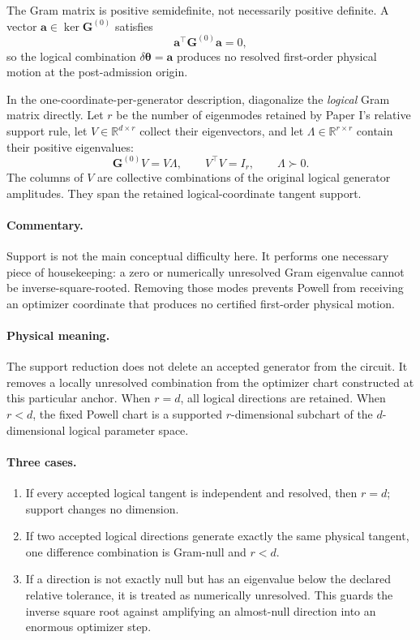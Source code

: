 \documentclass[11pt]{article}
\newcommand{\R}{\mathbb R}
\newcommand{\commentary}{\paragraph{Commentary.}}
\newcommand{\physical}{\paragraph{Physical meaning.}}
\begin{document}
The Gram matrix is positive semidefinite, not necessarily positive definite.
A vector
\(\mathbf a\in\ker\mathbf G^{(0)}\) satisfies
\begin{equation}
\mathbf a^\top\mathbf G^{(0)}\mathbf a=0,
\end{equation}
so the logical combination \(\delta\boldsymbol\theta=\mathbf a\) produces no
resolved first-order physical motion at the post-admission origin.

In the one-coordinate-per-generator description, diagonalize the
\emph{logical} Gram matrix directly.  Let \(r\) be the number of eigenmodes
retained by Paper I's relative support rule, let
\(V\in\R^{d\times r}\) collect their eigenvectors, and let
\(\Lambda\in\R^{r\times r}\) contain their positive eigenvalues:
\begin{equation}
\mathbf G^{(0)}V=V\Lambda,
\qquad
V^\top V=I_r,
\qquad
\Lambda\succ0.
\label{eq:logical-retained-eigensystem}
\end{equation}
The columns of \(V\) are collective combinations of the original logical
generator amplitudes.  They span the retained logical-coordinate tangent
support.

\commentary Support is not the main conceptual difficulty here.  It performs
one necessary piece of housekeeping: a zero or numerically unresolved Gram
eigenvalue cannot be inverse-square-rooted.  Removing those modes prevents
Powell from receiving an optimizer coordinate that produces no certified
first-order physical motion.

\physical The support reduction does not delete an accepted generator from
the circuit.  It removes a locally unresolved combination from the optimizer
chart constructed at this particular anchor.  When \(r=d\), all logical
directions are retained.  When \(r<d\), the fixed Powell chart is a supported
\(r\)-dimensional subchart of the \(d\)-dimensional logical parameter space.

\paragraph{Three cases.}
\begin{enumerate}[leftmargin=1.7em,itemsep=2pt,topsep=3pt]
\item If every accepted logical tangent is independent and resolved, then
\(r=d\); support changes no dimension.
\item If two accepted logical directions generate exactly the same physical
tangent, one difference combination is Gram-null and \(r<d\).
\item If a direction is not exactly null but has an eigenvalue below the
declared relative tolerance, it is treated as numerically unresolved.  This
guards the inverse square root against amplifying an almost-null direction
into an enormous optimizer step.
\end{enumerate}
\end{document}
